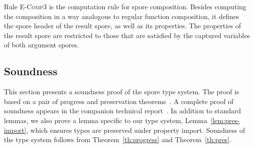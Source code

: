 \documentclass[runningheads]{llncs}
\newcommand{\seq}[1]{\overline{#1}}
\begin{document}
\begin{sloppypar}
Rule \textsc{E-Comp3} is the computation rule for spore composition. Besides computing the composition in a way analogous to regular function composition, it defines the spore header of the result spore, as well as its properties. The properties of the result spore are restricted to those that are satisfied by the captured variables of both argument spores.


\subsection{Soundness}\label{sec:soundness}

This section presents a soundness proof of the spore type system. The proof is based on a pair of progress and preservation theorems~\cite{WrightF94}. A complete proof of soundness appears in the companion technical report~\cite{SporesFormally}. In addition to standard lemmas, we also prove a lemma specific to our type system, Lemma~\ref{lem:pres-import}, which ensures types are preserved under property import. Soundness of the type system follows from Theorem~\ref{th:progress} and Theorem~\ref{th:pres}.







\end{sloppypar}
\end{document}
